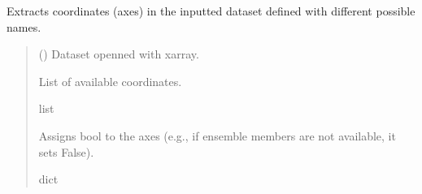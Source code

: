 \documentclass[a4paper,11pt,english]{sphinxmanual}
\begin{document}
\begin{fulllineitems}
\label{\detokenize{modules:climaccf.extract_data.extract_coordinates}}
\pysigstartsignatures
{}
\pysigstopsignatures
\sphinxAtStartPar
Extracts coordinates (axes) in the inputted dataset defined with different possible names.
\begin{quote}\begin{description}
\sphinxAtStartPar
{} () \textendash{} Dataset openned with xarray.

\sphinxAtStartPar
List of available coordinates.

\sphinxAtStartPar
list

\sphinxAtStartPar
Assigns bool to the axes (e.g., if ensemble members are not available, it sets False).

\sphinxAtStartPar
dict

\end{description}\end{quote}

\end{fulllineitems}

\end{document}
